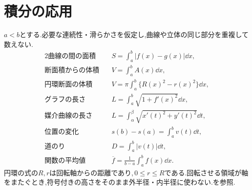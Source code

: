 \section{積分の応用}
$a<b$とする.必要な連続性・滑らかさを仮定し,曲線や立体の同じ部分を重複して数えない.
\begin{align*}
 \text{2曲線の間の面積}\quad&S=\int_a^b|f(x)-g(x)|\dd x,\\
 \text{断面積からの体積}\quad&V=\int_a^b A(x)\dd x,\\
 \text{円環断面の体積}\quad&V=\pi\int_a^b\{R(x)^2-r(x)^2\}\dd x,\\
 \text{グラフの長さ}\quad&L=\int_a^b\sqrt{1+f'(x)^2}\dd x,\\
 \text{媒介曲線の長さ}\quad&L=\int_\alpha^\beta\sqrt{x'(t)^2+y'(t)^2}\dd t,\\
 \text{位置の変化}\quad&s(b)-s(a)=\int_a^b v(t)\dd t,\\
 \text{道のり}\quad&D=\int_a^b|v(t)|\dd t,\\
 \text{関数の平均値}\quad&\overline f=\frac1{b-a}\int_a^b f(x)\dd x.
\end{align*}
円環の式の$R,r$は回転軸からの距離であり,\,$0\le r\le R$である.回転させる領域が軸をまたぐとき,符号付きの高さをそのまま外半径・内半径に使わない.を参照.



